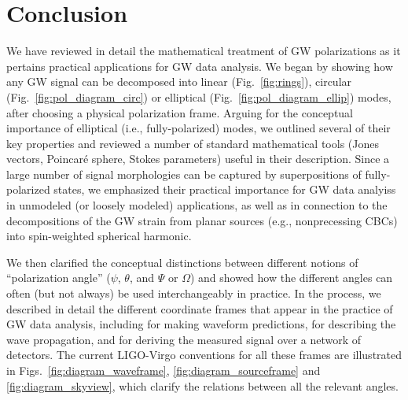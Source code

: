 \documentclass[aps,prd,twocolumn,superscriptaddress,preprintnumbers,floatfix,nofootinbib]{revtex4-2}
\begin{document}
\section{Conclusion}
\label{sec:conclusion}

We have reviewed in detail the mathematical treatment of GW polarizations as it pertains practical applications for GW data analysis.
We began by showing how any GW signal can be decomposed into linear (Fig.~\ref{fig:rings}), circular (Fig.~\ref{fig:pol_diagram_circ}) or elliptical (Fig.~\ref{fig:pol_diagram_ellip}) modes, after choosing a physical polarization frame.
Arguing for the conceptual importance of elliptical (i.e., fully-polarized) modes, we outlined several of their key properties and reviewed a number of standard mathematical tools (Jones vectors, Poincar\'{e} sphere, Stokes parameters) useful in their description.
Since a large number of signal morphologies can be captured by superpositions of fully-polarized states, we emphasized their practical importance for GW data analyiss in unmodeled (or loosely modeled) applications, as well as in connection to the decompositions of the GW strain from planar sources (e.g., nonprecessing \acp{CBC}) into spin-weighted spherical harmonic.

We then clarified the conceptual distinctions between different notions of ``polarization angle'' ($\psi$, $\theta$, and $\Psi$ or $\Omega$) and showed how the different angles can often (but not always) be used interchangeably in practice.
In the process, we described in detail the different coordinate frames that appear in the practice of GW data analysis, including for making waveform predictions, for describing the wave propagation, and for deriving the measured signal over a network of detectors.
The current LIGO-Virgo conventions for all these frames are illustrated in Figs.~\ref{fig:diagram_waveframe}, \ref{fig:diagram_sourceframe} and \ref{fig:diagram_skyview}, which clarify the relations between all the relevant angles.
\end{document}
